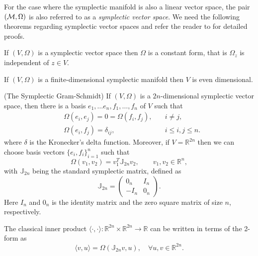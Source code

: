 For the case where the symplectic manifold is also a linear vector space, the pair $({\color{black} \mathcal M},\Omega)$ is also referred to as a \emph{symplectic vector space}. We {\edit need} the following theorems regarding symplectic vector spaces and refer the reader to \cite{de2006symplectic,Marsden:1999ck,Silva01lectureson} for detailed proofs.

{\edit
\begin{theorem} \label{theorem:Hasy:1.1} \cite{Marsden:1999ck}
If $(V,\Omega)$ is a symplectic vector space then $\Omega$ is a constant form, that is $\Omega_z$ is independent of $z\in V$. 
\end{theorem}
\begin{theorem} \label{theorem:Hasy:1.2} \cite{Marsden:1999ck}
If $(V,\Omega)$ is a finite-dimensional symplectic manifold then $V$ is even dimensional.
\end{theorem}
\begin{theorem} \label{theorem:Hasy:1.3} \cite{de2006symplectic}
(The Symplectic Gram-Schmidt) If $(V,\Omega)$ is a $2n$-dimensional symplectic vector space, then there is a basis $e_1,\dots e_n,f_1, \dots , f_n$ of $V$ such that
\begin{equation} \label{eq:Hasy:4}
\begin{aligned}
	& \Omega(e_i,e_j) = 0 = \Omega(f_i,f_j), \quad & i\neq j,\\
	& \Omega(e_i,f_j) = \delta_{ij}, & i\leq i,j \leq n.
\end{aligned}
\end{equation}
where $\delta$ is the Kronecker's delta function. {\blue Moreover, if $V = \mathbb{R}^{2n}$ then} we can choose basis vectors $\{e_i,f_i\}_{i=1}^n$ such that
\begin{equation} \label{eq:Hasy:5}
	\Omega(v_1,v_2) = v_1^T \mathbb J_{2n} v_2, \qquad v_1,v_2\in \mathbb R^n,
\end{equation}
with $\mathbb J_{2n}$ being the {\blue standard} symplectic matrix, defined as
\begin{equation} \label{eq:Hasy:6}
	\mathbb{J}_{2n} = 
	\begin{pmatrix}
		0_n & I_n \\
		-I_n & 0_n
	\end{pmatrix}.
\end{equation}
Here $I_n$ and $0_n$ is the identity matrix and the zero square matrix of size $n$, respectively.
\end{theorem}
\begin{theorem} \label{theorem:Hasy:1.4} \cite{Marsden:1999ck}
The classical inner product $\langle \cdot,\cdot \rangle:\mathbb R^{2n}\times \mathbb R^{2n}\to \mathbb R$ can be written in terms of the 2-form as
\begin{equation}
	\langle v,u \rangle = \Omega(\mathbb J_{2n}v,u),\quad \forall u,v \in \mathbb R^{2n}.
\end{equation}
\end{theorem}
}

